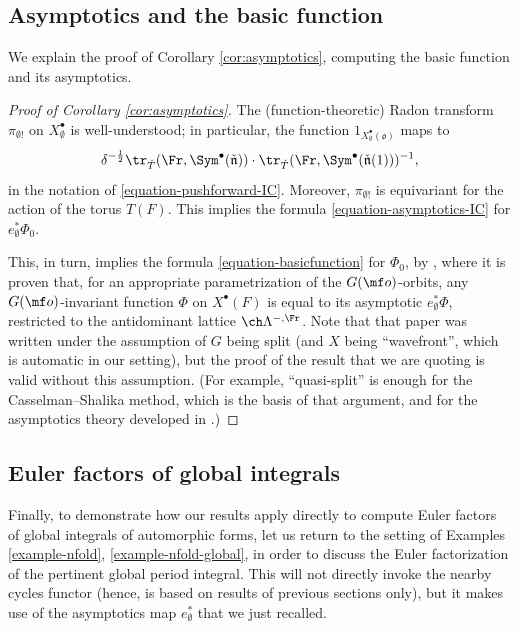 \documentclass[final]{amsart}
\theoremstyle{remark}
\theoremstyle{definition}
\numberwithin{equation}{section}
\begin{document}
\subsection{Asymptotics and the basic function} \label{sect:asymptotics}

We explain the proof of Corollary \ref{cor:asymptotics}, computing the basic function and its asymptotics.

\begin{proof}[Proof of Corollary \ref{cor:asymptotics}]
The (function-theoretic) Radon transform $\pi_{\emptyset !}$ on $X_\emptyset^\bullet$ is well-understood; in particular, the function $1_{X_\emptyset^\bullet(\mathfrak o)}$ maps to 
\[ \delta^{-\frac{1}{2}} \tr_{\check T}(\Fr, \Sym^\bullet (\check{\mathfrak n})) \cdot \tr_{\check T}(\Fr, \Sym^\bullet (\check{\mathfrak n}(1)))^{-1},\]
in the notation of \eqref{equation-pushforward-IC}. Moreover, $\pi_{\emptyset !}$ is equivariant for the action of the torus $T(F)$. This implies the formula \eqref{equation-asymptotics-IC} for $e_\emptyset^*\Phi_0$.

This, in turn, implies the formula \eqref{equation-basicfunction} for $\Phi_0$, by \cite[Corollary 5.5]{SaSatake}, where it is proven that, for an appropriate parametrization of the $G(\mf o)$-orbits, any $G(\mf o)$-invariant function $\Phi$ on $X^\bullet(F)$ is equal to its asymptotic $e_\emptyset^* \Phi$, restricted to the antidominant lattice $\ch\Lambda^{-,\Fr}$. Note that that paper was written under the assumption of $G$ being split (and $X$ being ``wavefront'', which is automatic in our setting), but the proof of the result that we are quoting is valid without this assumption. (For example, ``quasi-split'' is enough for the Casselman--Shalika method, which is the basis of that argument, and for the asymptotics theory developed in \cite{SV}.)
\end{proof}



\subsection{Euler factors of global integrals} \label{sect:nfold-explanation}


Finally, to demonstrate how our results apply directly to compute Euler factors of global integrals of automorphic forms, let us return to the setting of Examples \ref{example-nfold}, \ref{example-nfold-global}, in order to discuss the Euler factorization of the pertinent global period integral. This will not directly invoke the nearby cycles functor (hence, is based on results of previous sections only), but it makes use of the asymptotics map $e_\emptyset^*$ that we just recalled.
\end{document}
